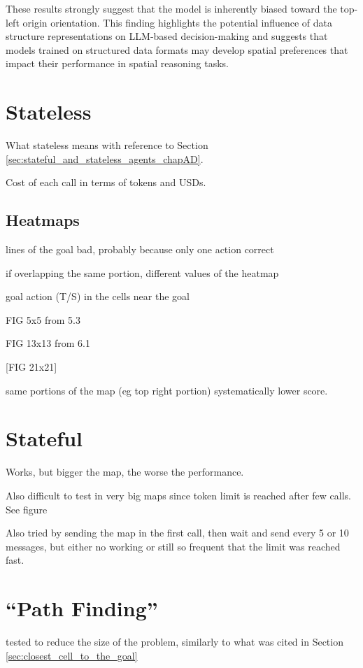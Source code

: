 These results strongly suggest that the model is inherently biased toward the top-left
origin orientation. This finding highlights the potential influence of data
structure representations on LLM-based decision-making and suggests that models
trained on structured data formats may develop spatial preferences that impact
their performance in spatial reasoning tasks.

\section{Stateless}
\label{sec:stateless}

What stateless means with reference to Section \ref{sec:stateful_and_stateless_agents_chapAD}.

Cost of each call in terms of tokens and USDs.

\subsection{Heatmaps}

lines of the goal bad, probably because only one action correct

if overlapping the same portion, different values of the heatmap

goal action (T/S) in the cells near the goal

FIG 5x5 from 5.3

FIG 13x13 from 6.1

[FIG 21x21]

same portions of the map (eg top right portion) systematically lower score.

\section{Stateful}
\label{sec:stateful}

Works, but bigger the map, the worse the performance.

Also difficult to test in very big maps since token limit is reached after few calls.
See figure

Also tried by sending the map in the first call, then wait and send every 5 or
10 messages, but either no working or still so frequent that the limit was reached
fast.

\section{``Path Finding''}

tested to reduce the size of the problem, similarly to what was cited in Section
\ref{sec:closest_cell_to_the_goal}

